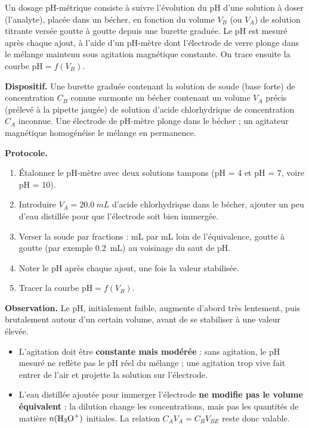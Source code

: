 \documentclass[11pt]{article}
\newcommand{\cle}[1]{{\popxbold\color{popdark}#1}}
\newcounter{popsec}
\newcounter{popsub}
\newcommand{\courssub}[1]{%
  \stepcounter{popsub}%
  \par\vspace{9pt}\noindent{\popxbold\fontsize{11.5}{13}\selectfont\color{popink}{\color{poporange}\thepopsec.\thepopsub}\hspace{6pt}#1}\par\nopagebreak\vspace{4pt}
}
\begin{document}
\courssub{Principe du dosage pH-métrique}

\begin{definition}
Un \cle{dosage pH-métrique} consiste à suivre l'évolution du pH d'une solution à doser (l'\cle{analyte}), placée dans un bécher, en fonction du volume $V_B$ (ou $V_A$) de solution \cle{titrante} versée goutte à goutte depuis une burette graduée. Le pH est mesuré après chaque ajout, à l'aide d'un pH-mètre dont l'électrode de verre plonge dans le mélange maintenu sous agitation magnétique constante. On trace ensuite la courbe $\mathrm{pH} = f(V_B)$.
\end{definition}

\begin{experience}
\textbf{Dispositif.} Une burette graduée contenant la solution de soude (base forte) de concentration $C_B$ connue surmonte un bécher contenant un volume $V_A$ précis (prélevé à la pipette jaugée) de solution d'acide chlorhydrique de concentration $C_A$ inconnue. Une électrode de pH-mètre plonge dans le bécher ; un agitateur magnétique homogénéise le mélange en permanence.

\textbf{Protocole.}
\begin{enumerate}
\item Étalonner le pH-mètre avec deux solutions tampons (pH = 4 et pH = 7, voire pH = 10).
\item Introduire $V_A = \SI{20,0}{mL}$ d'acide chlorhydrique dans le bécher, ajouter un peu d'eau distillée pour que l'électrode soit bien immergée.
\item Verser la soude par fractions : mL par mL loin de l'équivalence, goutte à goutte (par exemple \SI{0,2}{mL}) au voisinage du saut de pH.
\item Noter le pH après chaque ajout, une fois la valeur stabilisée.
\item Tracer la courbe $\mathrm{pH} = f(V_B)$.
\end{enumerate}

\textbf{Observation.} Le pH, initialement faible, augmente d'abord très lentement, puis brutalement autour d'un certain volume, avant de se stabiliser à une valeur élevée.
\end{experience}

\begin{attention}
\begin{itemize}
\item L'agitation doit être \textbf{constante mais modérée} : sans agitation, le pH mesuré ne reflète pas le pH réel du mélange ; une agitation trop vive fait entrer de l'air et projette la solution sur l'électrode.
\item L'eau distillée ajoutée pour immerger l'électrode \textbf{ne modifie pas le volume équivalent} : la dilution change les concentrations, mais pas les quantités de matière $n(\ce{H3O+})$ initiales. La relation $C_A V_A = C_B V_{BE}$ reste donc valable.
\end{itemize}
\end{attention}
\end{document}
